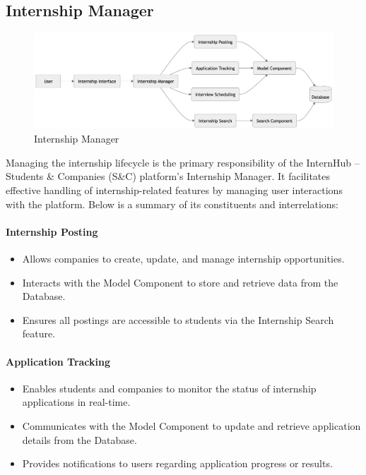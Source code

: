\subsection{Internship Manager}
\label{subsec:internship_manager}
\begin{figure}[H]
    \begin{center}
        \includegraphics[width=0.82\linewidth]{JhaBhatiaSharma/imagesDD/InternshipManager.png}
        \caption{Internship Manager}
        \label{fig:internshipmanager}%
    \end{center}
\end{figure}

Managing the internship lifecycle is the primary responsibility of the InternHub – Students \& Companies (S\&C) platform's Internship Manager. It facilitates effective handling of internship-related features by managing user interactions with the platform. Below is a summary of its constituents and interrelations:

\paragraph{Internship Posting}
\begin{itemize}
    \item Allows companies to create, update, and manage internship opportunities.
    \item Interacts with the Model Component to store and retrieve data from the Database.
    \item Ensures all postings are accessible to students via the Internship Search feature.
\end{itemize}

\paragraph{Application Tracking}
\begin{itemize}
    \item Enables students and companies to monitor the status of internship applications in real-time.
    \item Communicates with the Model Component to update and retrieve application details from the Database.
    \item Provides notifications to users regarding application progress or results.
\end{itemize}

